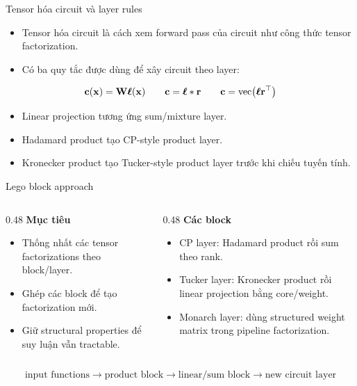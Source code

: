 \begin{frame}{Tensor hóa circuit và layer rules}
\small
\begin{itemize}
    \item Tensor hóa circuit là cách xem forward pass của circuit như công thức tensor factorization.
    \item Có ba quy tắc được dùng để xây circuit theo layer:
\end{itemize}
\[
    \mathbf{c}(\mathbf{x})=\mathbf{W}\boldsymbol{\ell}(\mathbf{x})
    \qquad
    \mathbf{c}=\boldsymbol{\ell}\ast\mathbf{r}
    \qquad
    \mathbf{c}=\operatorname{vec}\!\left(\boldsymbol{\ell}\mathbf{r}^{\top}\right)
\]
\begin{itemize}
    \item Linear projection tương ứng sum/mixture layer.
    \item Hadamard product tạo CP-style product layer.
    \item Kronecker product tạo Tucker-style product layer trước khi chiếu tuyến tính.
\end{itemize}
\end{frame}

\begin{frame}{Lego block approach}
\small
\begin{columns}[T,totalwidth=\textwidth]
    \begin{column}{0.48\textwidth}
        \textbf{Mục tiêu}
        \begin{itemize}
            \item Thống nhất các tensor factorizations theo block/layer.
            \item Ghép các block để tạo factorization mới.
            \item Giữ structural properties để suy luận vẫn tractable.
        \end{itemize}
    \end{column}
    \begin{column}{0.48\textwidth}
        \textbf{Các block}
        \begin{itemize}
            \item CP layer: Hadamard product rồi sum theo rank.
            \item Tucker layer: Kronecker product rồi linear projection bằng core/weight.
            \item Monarch layer: dùng structured weight matrix trong pipeline factorization.
        \end{itemize}
    \end{column}
\end{columns}
\[
    \text{input functions}
    \rightarrow
    \text{product block}
    \rightarrow
    \text{linear/sum block}
    \rightarrow
    \text{new circuit layer}
\]
\end{frame}

